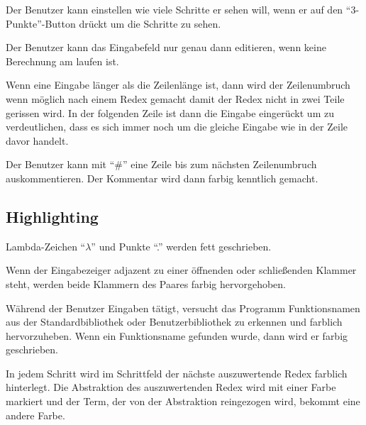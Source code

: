 \documentclass[parskip=full,11pt,twoside]{scrartcl}
\begin{document}
Der Benutzer kann einstellen wie viele Schritte er sehen will, wenn er auf den \enquote {3-Punkte}-Button drückt um die Schritte zu sehen.

Der Benutzer kann das Eingabefeld nur genau dann editieren, wenn keine Berechnung am laufen ist.

Wenn eine Eingabe länger als die Zeilenlänge ist, dann wird der Zeilenumbruch wenn möglich nach einem Redex gemacht damit der Redex nicht in zwei Teile gerissen wird. In der folgenden Zeile ist dann
die Eingabe eingerückt um zu verdeutlichen, dass es sich immer noch um die gleiche Eingabe wie in der Zeile davor handelt.

Der Benutzer kann mit \enquote{\#} eine Zeile bis zum nächsten Zeilenumbruch auskommentieren.
Der Kommentar wird dann farbig kenntlich gemacht.

\subsection{Highlighting}

Lambda-Zeichen \enquote{$\lambda$} und Punkte \enquote{.} werden fett geschrieben.

Wenn der Eingabezeiger adjazent zu einer öffnenden oder schließenden Klammer steht, werden beide Klammern des Paares farbig hervorgehoben.

Während der Benutzer Eingaben tätigt, versucht das Programm Funktionsnamen aus der Standardbibliothek oder Benutzerbibliothek zu erkennen und farblich hervorzuheben. Wenn ein Funktionsname gefunden wurde, dann wird er farbig geschrieben.

In jedem Schritt wird im Schrittfeld der nächste auszuwertende Redex farblich hinterlegt.
Die Abstraktion des auszuwertenden Redex wird mit einer Farbe markiert und der Term, der von der Abstraktion reingezogen wird, bekommt eine andere Farbe.
\end{document}
